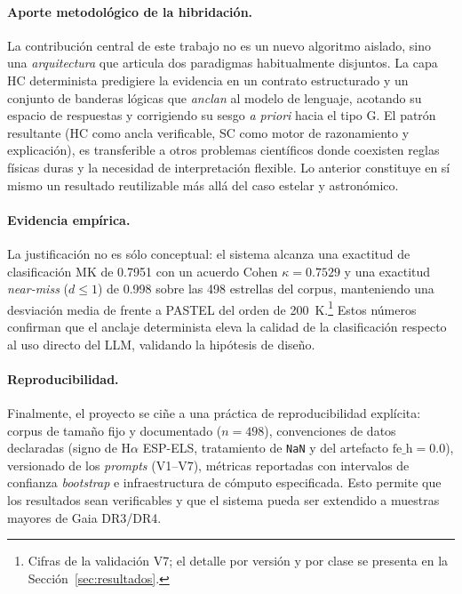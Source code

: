 \paragraph{Aporte metodológico de la hibridación.} La contribución central de
este trabajo no es un nuevo algoritmo aislado, sino una \emph{arquitectura} que
articula dos paradigmas habitualmente disjuntos. La capa HC determinista
predigiere la evidencia en un contrato estructurado y un conjunto de banderas
lógicas que \emph{anclan} al modelo de lenguaje, acotando su espacio de
respuestas y corrigiendo su sesgo \emph{a priori} hacia el tipo G. El patrón
resultante (HC como ancla verificable, SC como motor de razonamiento y
explicación), es transferible a otros problemas científicos donde coexisten
reglas físicas duras y la necesidad de interpretación flexible. Lo anterior constituye en
sí mismo un resultado reutilizable más allá del caso estelar y astronómico.

\paragraph{Evidencia empírica.} La justificación no es sólo conceptual: el
sistema alcanza una exactitud de clasificación MK de \num{0.7951} con un acuerdo
Cohen $\kappa = \num{0.7529}$ y una exactitud \emph{near-miss} ($d\le 1$) de
\num{0.998} sobre las \num{498} estrellas del corpus, manteniendo una desviación
media de \teff{} frente a PASTEL del orden de \SI{200}{\kelvin}.\footnote{Cifras
de la validación V7; el detalle por versión y por clase se presenta en la
Sección~\ref{sec:resultados}.} Estos números confirman que el anclaje
determinista eleva la calidad de la clasificación respecto al uso directo del
LLM, validando la hipótesis de diseño.

\paragraph{Reproducibilidad.} Finalmente, el proyecto se ciñe a una práctica de
reproducibilidad explícita: corpus de tamaño fijo y documentado ($n=498$),
convenciones de datos declaradas (signo de H$\alpha$ ESP-ELS, tratamiento de
\texttt{NaN} y del artefacto $\mathrm{fe\_h}=0.0$), versionado de los
\emph{prompts} (V1--V7), métricas reportadas con intervalos de confianza
\emph{bootstrap} e infraestructura de cómputo especificada. Esto permite que los
resultados sean verificables y que el sistema pueda ser extendido a muestras
mayores de Gaia DR3/DR4.
